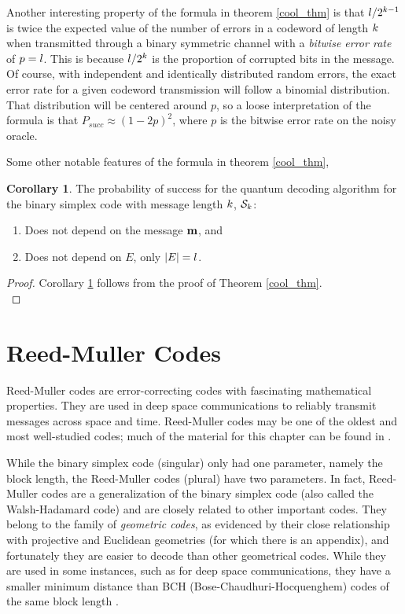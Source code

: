 \documentclass[12pt,twoside]{reedthesis}
\theoremstyle{definition}
\newtheorem{corollary}[theorem]{Corollary}
\begin{document}
Another interesting property of the formula in theorem \ref{cool_thm} is that $l/2^{k-1}$ is twice the expected value of the number of errors in a codeword of length $k$ when transmitted through a binary symmetric channel with a \emph{bitwise error rate} of $p = l$. This is because $l/2^{k}$ is the proportion of corrupted bits in the message. Of course, with independent and identically distributed random errors, the exact error rate for a given codeword transmission will follow a binomial distribution. That distribution will be centered around $p$, so a loose interpretation of the formula is that $P_{succ} \approx (1-2p)^2$, where $p$ is the bitwise error rate on the noisy oracle.


Some other notable features of the formula in theorem \ref{cool_thm}, 
\begin{corollary} \label{corollary}The probability of success for the quantum decoding algorithm for the binary simplex code with message length $k$, $\mathcal{S}_{k}$:
\begin{enumerate}
\item Does not depend on the message $\mathbf{m}$, and
\item Does not depend on $E$, only $\lvert E \rvert = l$.
\end{enumerate} 
\end{corollary}
\begin{proof}
Corollary \ref{corollary} follows from the proof of Theorem \ref{cool_thm}.\\
\end{proof}


\chapter{Reed-Muller Codes}
Reed-Muller codes are error-correcting codes with fascinating mathematical properties.  They are used in deep space communications to reliably transmit messages across space and time. Reed-Muller codes may be one of the oldest and most well-studied codes; much of the material for this chapter can be found in \citep{macwilliamssloane}.

While the binary simplex code (singular) only had one parameter, namely the block length, the Reed-Muller codes (plural) have two parameters. In fact, Reed-Muller codes are a generalization of the binary simplex code (also called the Walsh-Hadamard code) and are closely related to other important codes. They belong to the family of \textit{geometric codes}, as evidenced by their close relationship with projective and Euclidean geometries (for which there is an appendix), and fortunately they are easier to decode than other geometrical codes. While they are used in some instances, such as for deep space communications, they have a smaller minimum distance than BCH (Bose-Chaudhuri-Hocquenghem) codes of the same block length \citep{macwilliamssloane}.
\end{document}
